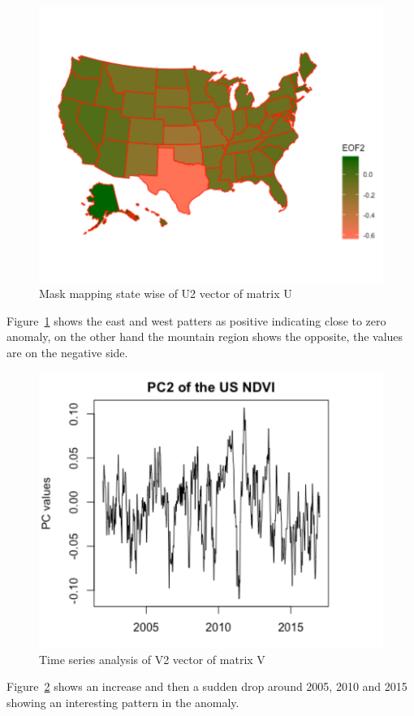     \begin{figure}[H]
            \centering
            \includegraphics[width=0.70\linewidth]{figures/ch5/SVD/eof2.png}
            \caption{\label{fig:EOF_2} Mask mapping state wise of U2 vector of matrix U}
    \end{figure}
    
     Figure~\ref{fig:EOF_2} shows the east and west patters as positive indicating close to zero anomaly, on the other hand the mountain region shows the opposite, the values are on the negative side.
    
    \begin{figure}[H]
            \centering
            \includegraphics[width=0.70\linewidth]{figures/ch5/SVD/pc2.png}
            \caption{\label{fig:V_2} Time series analysis of V2 vector of matrix V}
    \end{figure}
    
    Figure~\ref{fig:V_2} shows an increase and then a sudden drop around 2005, 2010 and 2015 showing an interesting pattern in the anomaly.
    
